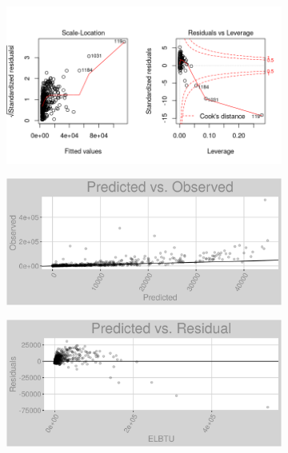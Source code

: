 \begin{figure}[h]
\begin{subfigure}{1\textwidth}
\includegraphics[width=.99\textwidth, height=0.3\textheight]{Images/electricity_nn_full_resid_2.png}
\end{subfigure}
\begin{subfigure}{1\textwidth}
\centering
\includegraphics[width=.99\textwidth, height=0.3\textheight]{Images/electricity_nn_full_pvo.png}
\end{subfigure}
\begin{subfigure}{1\textwidth}
\centering
\includegraphics[width=.99\textwidth, height=0.3\textheight]{Images/electricity_nn_full_pvr.png}
\end{subfigure}
\end{figure}
